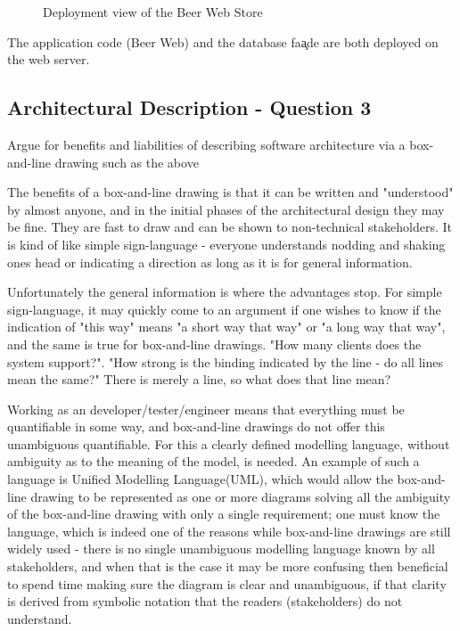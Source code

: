 \begin{figure}[!htb]
\centerline{}
\caption{Deployment view of the Beer Web Store}
\label{fig:ad_allocation}
\end{figure}

The application code (Beer Web) and the database fa\c ade are
both deployed on the web server.

\subsection{Architectural Description - Question 3}

\begin{question}
Argue for benefits and liabilities of describing software
architecture via a box-and-line drawing such as the above
\end{question}

The benefits of a box-and-line drawing is that it can be written and "understood" by almost anyone, and in the initial phases of the architectural design they may be fine. They are fast to draw and can be shown to non-technical stakeholders. It is kind of like simple sign-language - everyone understands nodding and shaking ones head or indicating a direction as long as it is for general information.

Unfortunately the general information is where the advantages stop. For simple sign-language, it may quickly come to an argument if one wishes to know if the indication of "this way" means "a short way that way" or "a long way that way", and the same is true for box-and-line drawings. "How many clients does the system support?". "How strong is the binding indicated by the line - do all lines mean the same?" There is merely a line, so what does that line mean?

Working as an developer/tester/engineer means that everything must be quantifiable in some way, and box-and-line drawings do not offer this unambiguous quantifiable. For this a clearly defined modelling language, without ambiguity as to the meaning of the model, is needed. An example of such a language is Unified Modelling Language(UML), which would allow the box-and-line drawing to be represented as one or more diagrams solving all the ambiguity of the box-and-line drawing with only a single requirement; one must know the language, which is indeed one of the reasons while box-and-line drawings are still widely used - there is no single unambiguous modelling language known by all stakeholders, and when that is the case it may be more confusing then beneficial to spend time making sure the diagram is clear and unambiguous, if that clarity is derived from symbolic notation that the readers (stakeholders) do not understand.

